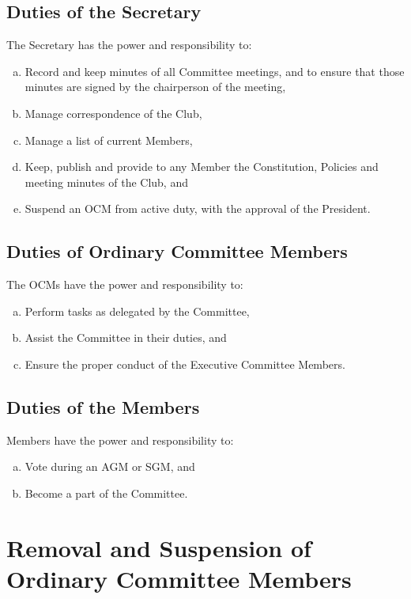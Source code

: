 \documentclass[a4paper,12pt]{article}
\begin{document}
\subsection{Duties of the Secretary}

The Secretary has the power and responsibility to:

\begin{enumerate}[a)]
	\item Record and keep minutes of all Committee meetings, and to ensure that those minutes are signed by the chairperson of the meeting,
	\item Manage correspondence of the Club,
	\item Manage a list of current Members,
	\item Keep, publish and provide to any Member the Constitution, Policies and meeting minutes of the Club, and
	\item Suspend an OCM from active duty, with the approval of the President.
\end{enumerate}

\subsection{Duties of Ordinary Committee Members}

The OCMs have the power and responsibility to:

\begin{enumerate}[a)]
	\item Perform tasks as delegated by the Committee,
	\item Assist the Committee in their duties, and
	\item Ensure the proper conduct of the Executive Committee Members.
\end{enumerate}

\subsection{Duties of the Members}

Members have the power and responsibility to:

\begin{enumerate}[a)]
	\item Vote during an AGM or SGM, and
	\item Become a part of the Committee.
\end{enumerate}

\section{Removal and Suspension of Ordinary Committee Members}
\end{document}
